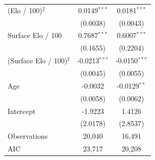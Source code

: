 \begin{tabular}{lcc}
(Elo / 100)$^2$ & 0.0149$^{***}$ & 0.0181$^{***}$ \\
 & (0.0038) & (0.0043) \\
Surface Elo / 100 & 0.7687$^{***}$ & 0.6007$^{***}$ \\
 & (0.1655) & (0.2204) \\
(Surface Elo / 100)$^2$ & -0.0213$^{***}$ & -0.0150$^{***}$ \\
 & (0.0045) & (0.0055) \\
Age & -0.0032 & -0.0129$^{**}$ \\
 & (0.0058) & (0.0062) \\
Intercept & -1.9223 & 1.4126 \\
 & (2.0178) & (2.8537) \\
\midrule
Observations & 20,040 & 16,491 \\
AIC & 23,717 & 20,208 \\
\bottomrule
\end{tabular}
